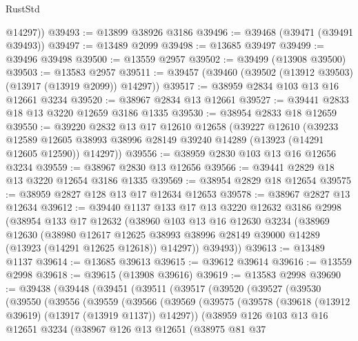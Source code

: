 \begin{lexlean}{RustStd}
\begin{coremodule}
        @14297))
@39493 := @13899 @38926 @3186
@39496 := @39468 (@39471 (@39491 @39493))
@39497 := @13489 @2099
@39498 := @13685 @39497
@39499 := @39496 @39498
@39500 := @13559 @2957
@39502 := @39499 (@13908 @39500)
@39503 := @13583 @2957
@39511 := @39457 (@39460 (@39502 (@13912 @39503) (@13917 (@13919 @2099)) @14297))
@39517 := @38959 @2834 @103 @13 @16 @12661 @3234
@39520 := @38967 @2834 @13 @12661
@39527 := @39441 @2833 @18 @13 @3220 @12659 @3186 @1335
@39530 := @38954 @2833 @18 @12659
@39550 := @39220
    @2832
    @13
    @17
    @12610
    @12658
    (@39227
      @12610
      (@39233
        @12589
        @12605
        @38993
        @38996
        @28149
        @39240
        @14289
        (@13923 (@14291 @12605 @12590))
        @14297))
@39556 := @38959 @2830 @103 @13 @16 @12656 @3234
@39559 := @38967 @2830 @13 @12656
@39566 := @39441 @2829 @18 @13 @3220 @12654 @3186 @1335
@39569 := @38954 @2829 @18 @12654
@39575 := @38959 @2827 @128 @13 @17 @12634 @12653
@39578 := @38967 @2827 @13 @12634
@39612 := @39440
    @1137
    @133
    @17
    @13
    @3220
    @12632
    @3186
    @2998
    (@38954
      @133
      @17
      @12632
      (@38960
        @103
        @13
        @16
        @12630
        @3234
        (@38969
          @12630
          (@38980
            @12617
            @12625
            @38993
            @38996
            @28149
            @39000
            @14289
            (@13923 (@14291 @12625 @12618))
            @14297))
        @39493))
@39613 := @13489 @1137
@39614 := @13685 @39613
@39615 := @39612 @39614
@39616 := @13559 @2998
@39618 := @39615 (@13908 @39616)
@39619 := @13583 @2998
@39690 := @39438
    (@39448
      (@39451
        (@39511
          (@39517
            (@39520
              (@39527
                (@39530
                  (@39550
                    (@39556
                      (@39559
                        (@39566
                          (@39569
                            (@39575
                              (@39578 (@39618 (@13912 @39619) (@13917 (@13919 @1137)) @14297))
                              (@38959
                                @126
                                @103
                                @13
                                @16
                                @12651
                                @3234
                                (@38967
                                  @126
                                  @13
                                  @12651
                                  (@38975
                                    @81
                                    @37

\end{coremodule}
\end{lexlean}
